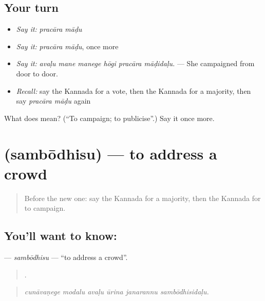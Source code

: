 \subsection*{Your turn}
\begin{itemize}
\raggedright
  \item \emph{Say it:} \emph{pracāra māḍu}
  \item \emph{Say it:} \emph{pracāra māḍu}, once more
  \item \emph{Say it:} \emph{avaḷu mane manege hōgi pracāra māḍidaḷu.} — She campaigned from door to door.
  \item \emph{Recall:} say the Kannada for a vote, then the Kannada for a majority, then say \emph{pracāra māḍu} again
\end{itemize}

\begin{tcolorbox}[breakable,colback=teal!4,colframe=teal!35!black,title={Before you move on}]
What does   mean? (\textquotedblleft{}To campaign; to publicise\textquotedblright{}.) Say it once more.
\end{tcolorbox}
\section[\texorpdfstring{\kn{ಸಂಬೋಧಿಸು} (sambōdhisu)}{ಸಂಬೋಧಿಸು (sambōdhisu)}]{ (sambōdhisu) — to address a crowd}

\label{lesson:KA-C392-sambodhisu}



\begin{quote}
Before the new one: say the Kannada for a majority, then the Kannada for to campaign.
\end{quote}

\subsection*{You'll want to know: }
\textbf{} — \emph{sambōdhisu} — \textquotedblleft{}to address a crowd\textquotedblright{}.

\begin{quote}
     .
\end{quote}

\begin{quote}
\emph{cunāvaṇege modalu avaḷu ūrina janarannu sambōdhisidaḷu.}
\end{quote}

